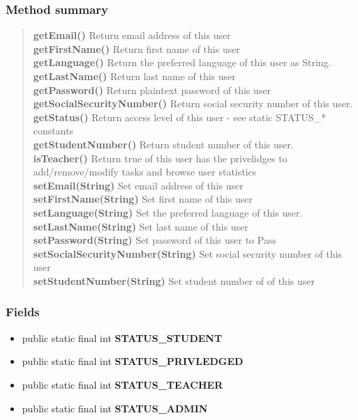 {{\subsubsection{Method summary}{
\begin{verse}
{\bf getEmail()} Return email address of this user\\
{\bf getFirstName()} Return first name of this user\\
{\bf getLanguage()} Return the preferred language of this user as String.\\
{\bf getLastName()} Return last name of this user\\
{\bf getPassword()} Return plaintext password of this user\\
{\bf getSocialSecurityNumber()} Return social security number of this user.\\
{\bf getStatus()} Return access level of this user - see static STATUS\_* constants\\
{\bf getStudentNumber()} Return student number of this user.\\
{\bf isTeacher()} Return true of this user has the privelidges to add/remove/modify tasks and browse user statistics\\
{\bf setEmail(String)} Set email address of this user\\
{\bf setFirstName(String)} Set first name of this user\\
{\bf setLanguage(String)} Set the preferred language of this user.\\
{\bf setLastName(String)} Set last name of this user\\
{\bf setPassword(String)} Set password of this user to Pass\\
{\bf setSocialSecurityNumber(String)} Set social security number of this user\\
{\bf setStudentNumber(String)} Set student number of of this user\\
\end{verse}
}
\subsubsection{Fields}{
\begin{itemize}
\item{
\label{fi.helsinki.cs.kohahdus.User.STATUS_STUDENT}public static final int {\bf STATUS\_STUDENT}}
\item{
\label{fi.helsinki.cs.kohahdus.User.STATUS_PRIVLEDGED}public static final int {\bf STATUS\_PRIVLEDGED}}
\item{
\label{fi.helsinki.cs.kohahdus.User.STATUS_TEACHER}public static final int {\bf STATUS\_TEACHER}}
\item{
\label{fi.helsinki.cs.kohahdus.User.STATUS_ADMIN}public static final int {\bf STATUS\_ADMIN}}
\end{itemize}
}
}}
